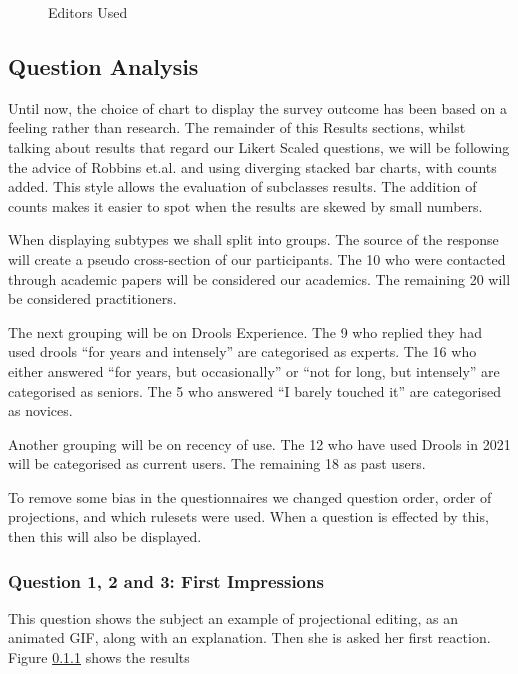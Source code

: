 \begin{figure}[h]
    \centering
    \caption{Editors Used}
    \label{fig:editorUsage}
\end{figure}


\subsection{Question Analysis}
Until now, the choice of chart to display the survey outcome has been based on a feeling rather than research. 
The remainder of this Results sections, whilst talking about results that regard our Likert Scaled questions, we will be following the advice of Robbins et.al.\cite{robbins2011plotting} and using diverging stacked bar charts, with counts added.
This style allows the evaluation of subclasses results.
The addition of counts makes it easier to spot when the results are skewed by small numbers.

When displaying subtypes we shall split into groups.
The source of the response will create a pseudo cross-section of our participants.
The 10 who were contacted through academic papers will be considered our academics.
The remaining 20 will be considered practitioners.

The next grouping will be on Drools Experience.
The 9 who replied they had used drools ``for years and intensely'' are categorised as experts.
The 16 who either answered ``for years, but occasionally'' or ``not for long, but intensely'' are categorised as seniors.
The 5 who answered ``I barely touched it'' are categorised as novices.

Another grouping will be on recency of use.
The 12 who have used Drools in 2021 will be categorised as current users.
The remaining 18 as past users.

To remove some bias in the questionnaires we changed question order, order of projections, and which rulesets were used.
When a question is effected by this, then this will also be displayed.

\subsubsection{Question 1, 2 and 3: First Impressions}
This question shows the subject an example of projectional editing, as an animated GIF, along with an explanation.
Then she is asked her first reaction.
Figure \ref{} shows the results



